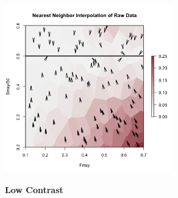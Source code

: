 {\begin{figure}[h!]
\begin{minipage}[h!]{0.49\textwidth}
\includegraphics[width=0.65\textwidth]{../edits/obsDirectionalBiasSubExpT45MinCon2X.png}
\end{minipage}
\begin{minipage}[h!]{0.49\textwidth}
\centering
\vspace{-1.5cm}
\textbf{Low Contrast}


\end{minipage}
\end{figure}}
